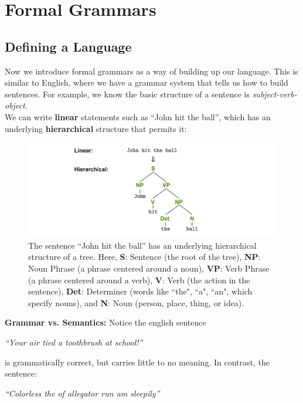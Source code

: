 \section{Formal Grammars}
\subsection{Defining a Language}
Now we introduce formal grammars as a way of building up our language.
This is similar to English, where we have a grammar system that tells us how to build sentences.
For example, we know the basic structure of a sentence is \textit{subject-verb-object}. \\

\noindent
We can write \textbf{linear} statements such as ``John hit the ball'', which has an underlying \textbf{hierarchical} structure that permits it:

\begin{figure}[h]
\centering
\includegraphics[width=1\textwidth]{Sections/Formal/eng.png}
\caption{The sentence ``John hit the ball'' has an underlying hierarchical structure of a tree. Here, \textbf{S}: Sentence (the root of the tree), \textbf{NP}: Noun Phrase (a phrase centered around a noun), \textbf{VP}: Verb Phrase (a phrase centered around a verb), \textbf{V}: Verb (the action in the sentence), \textbf{Det}: Determiner (words like ``the", ``a", ``an", which specify nouns), and \textbf{N}: Noun (person, place, thing, or idea).}
\end{figure}

\noindent
\textbf{Grammar vs. Semantics:} Notice the english sentence 

\begin{center}
\Large \textit{``Your air tied a toothbrush at school!''}
\end{center}

\noindent
is grammatically correct, but carries little to no meaning. In contrast, 
the sentence:

\begin{center}
\Large \textit{``Colorless the of allegator run am sleepily''}
\end{center}

